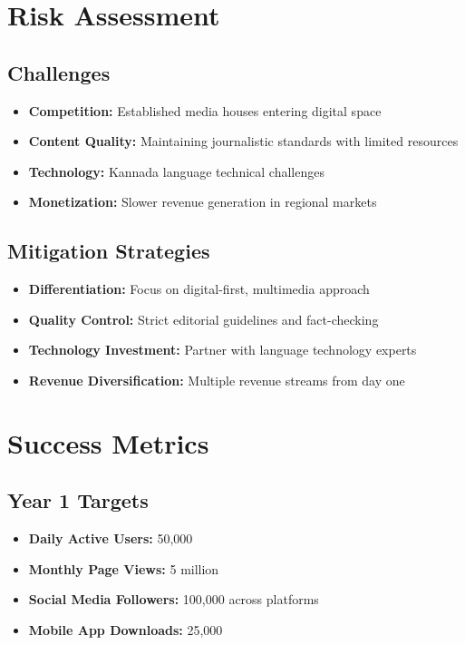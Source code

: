 \documentclass[11pt,a4paper]{article}
\begin{document}
\section{Risk Assessment}

\subsection{Challenges}
\begin{warning}
\begin{itemize}
    \item \textbf{Competition:} Established media houses entering digital space
    \item \textbf{Content Quality:} Maintaining journalistic standards with limited resources
    \item \textbf{Technology:} Kannada language technical challenges
    \item \textbf{Monetization:} Slower revenue generation in regional markets
\end{itemize}
\end{warning}

\subsection{Mitigation Strategies}
\begin{highlight}
\begin{itemize}
    \item \textbf{Differentiation:} Focus on digital-first, multimedia approach
    \item \textbf{Quality Control:} Strict editorial guidelines and fact-checking
    \item \textbf{Technology Investment:} Partner with language technology experts
    \item \textbf{Revenue Diversification:} Multiple revenue streams from day one
\end{itemize}
\end{highlight}

\section{Success Metrics}

\subsection{Year 1 Targets}
\begin{itemize}[leftmargin=2em]
    \item \textbf{Daily Active Users:} 50,000
    \item \textbf{Monthly Page Views:} 5 million
    \item \textbf{Social Media Followers:} 100,000 across platforms
    \item \textbf{Mobile App Downloads:} 25,000
\end{itemize}
\end{document}
